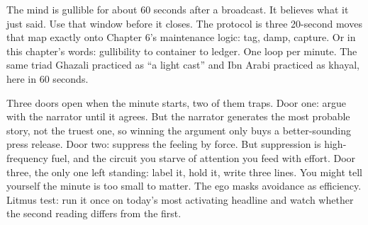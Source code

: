 The mind is gullible for about 60 seconds after a broadcast. It believes what it just said. Use that window before it closes. The protocol is three 20-second moves that map exactly onto Chapter 6's maintenance logic: tag, damp, capture. Or in this chapter's words: gullibility to container to ledger. One loop per minute. The same triad Ghazali practiced as ``a light cast'' and Ibn Arabi practiced as khayal, here in 60 seconds.

Three doors open when the minute starts, two of them traps. Door one: argue with the narrator until it agrees. But the narrator generates the most probable story, not the truest one, so winning the argument only buys a better-sounding press release. Door two: suppress the feeling by force. But suppression is high-frequency fuel, and the circuit you starve of attention you feed with effort. Door three, the only one left standing: label it, hold it, write three lines. You might tell yourself the minute is too small to matter. The ego masks avoidance as efficiency. Litmus test: run it once on today's most activating headline and watch whether the second reading differs from the first.

